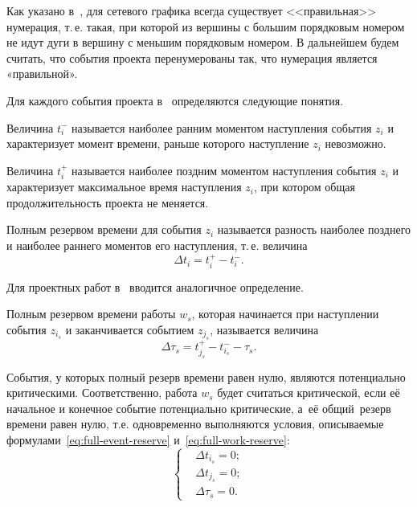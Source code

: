 Как указано в~\cite{Balashov_IPU}, для сетевого графика всегда существует <<правильная>> нумерация, т.\,е. такая, при которой из вершины с большим порядковым номером не идут дуги в вершину с меньшим порядковым номером. В дальнейшем будем считать, что события проекта перенумерованы так, что нумерация является «правильной».

Для каждого события проекта в~\cite{Eddous, Taha_Operation_Research, Balashov_IPU} определяются следующие понятия.
\begin{mydef}
  Величина $t_{i}^{-}$ называется наиболее ранним моментом наступления события $z_i$ и характеризует момент времени, раньше которого наступление $z_i$ невозможно.
\end{mydef}

\begin{mydef}
  Величина $t_{i}^{+}$ называется наиболее поздним моментом наступления события $z_i$ и характеризует максимальное время наступления $z_i$, при котором общая продолжительность проекта не меняется.
\end{mydef}

\begin{mydef}
  Полным резервом времени для события $z_i$ называется разность наиболее позднего и наиболее раннего моментов его наступления, т.\,е. величина
\begin{equation}
\label{eq:full-event-reserve}
  \Delta t_i=t^+_i-t^-_i.
\end{equation}
\end{mydef}

Для проектных работ в~\cite{Eddous} вводится аналогичное определение.
\begin{mydef}
  Полным резервом времени работы $w_s$, которая начинается при наступлении события $z_{i_s}$ и заканчивается событием $z_{j_s}$, называется величина
\begin{equation}
\label{eq:full-work-reserve}
  \Delta \tau_s=t_{j_s}^{+}-t_{i_s}^{-}-\tau_s.
\end{equation}
\end{mydef}
	
События, у которых полный резерв времени равен нулю, являются потенциально критическими. Соответственно, работа $w_s$ будет считаться критической, если её начальное и конечное событие потенциально критические, а~её общий~резерв времени равен нулю, т.е. одновременно выполняются условия, описываемые формулами~\eqref{eq:full-event-reserve} и~\eqref{eq:full-work-reserve}:
\begin{equation}
\label{eq:critical-work-def}
  \left\{ \begin{aligned}
    & \Delta t_{i_s}=0; \\ 
    & \Delta t_{j_s}=0; \\ 
    & \Delta \tau_s=0.
  \end{aligned} \right.
\end{equation}

